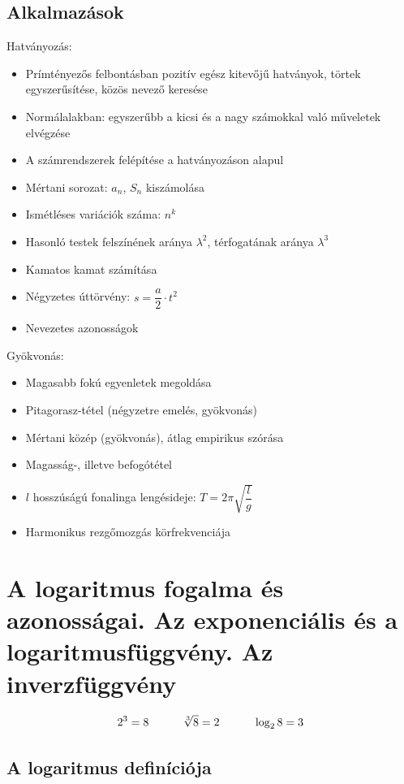 \documentclass[12pt,a4paper]{article}
\begin{document}
\subsection{Alkalmazások}
Hatványozás:
\begin{itemize}
\item Prímtényezős felbontásban pozitív egész kitevőjű hatványok, törtek egyszerűsítése, közös nevező keresése
\item Normálalakban: egyszerűbb a kicsi és a nagy számokkal való műveletek elvégzése
\item A számrendszerek felépítése a hatványozáson alapul
\item Mértani sorozat: $a_n$, $S_n$ kiszámolása
\item Ismétléses variációk száma: $n^k$
\item Hasonló testek felszínének aránya $\lambda^2$, térfogatának aránya $\lambda^3$
\item Kamatos kamat számítása
\item Négyzetes úttörvény: $s=\dfrac{a}{2}\cdot t^2$
\item Nevezetes azonosságok
\end{itemize}
Gyökvonás:
\begin{itemize}
\item Magasabb fokú egyenletek megoldása
\item Pitagorasz-tétel (négyzetre emelés, gyökvonás)
\item Mértani közép (gyökvonás), átlag empirikus szórása
\item Magasság-, illetve befogótétel
\item $l$ hosszúságú fonalinga lengésideje: $T=2\pi\sqrt{\dfrac{l}{g}}$
\item Harmonikus rezgőmozgás körfrekvenciája
\end{itemize}




\section{A logaritmus fogalma és azonosságai. Az exponenciális és a logaritmusfüggvény. Az inverzfüggvény}
$$2^3=8 \hspace{30px} \sqrt[3]{8}=2 \hspace{30px} \log_2 8 =3$$
\subsection{A logaritmus definíciója}
\end{document}
